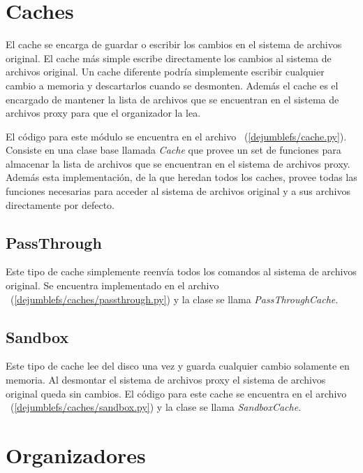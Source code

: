 \section{Caches}

El cache se encarga de guardar o escribir los cambios en el sistema de archivos original. El cache más simple escribe directamente los cambios al sistema de archivos original. Un cache diferente podría simplemente escribir cualquier cambio a memoria y descartarlos cuando se desmonten. Además el cache es el encargado de mantener la lista de archivos que se encuentran en el sistema de archivos proxy para que el organizador la lea.


El código para este módulo se encuentra en el archivo ~(\ref{dejumblefs/cache.py}). Consiste en una clase base llamada \textit{Cache} que provee un set de funciones para almacenar la lista de archivos que se encuentran en el sistema de archivos proxy. Además esta implementación, de la que heredan todos los caches, provee todas las funciones necesarias para acceder al sistema de archivos original y a sus archivos directamente por defecto.

\subsection{PassThrough}

Este tipo de cache simplemente reenvía todos los comandos al sistema de archivos original. Se encuentra implementado en el archivo ~(\ref{dejumblefs/caches/passthrough.py}) y la clase se llama \textit{PassThroughCache}.

\subsection{Sandbox}

Este tipo de cache lee del disco una vez y guarda cualquier cambio solamente en memoria. Al desmontar el sistema de archivos proxy el sistema de archivos original queda sin cambios. El código para este cache se encuentra en el archivo ~(\ref{dejumblefs/caches/sandbox.py}) y la clase se llama \textit{SandboxCache}.


\section{Organizadores}

